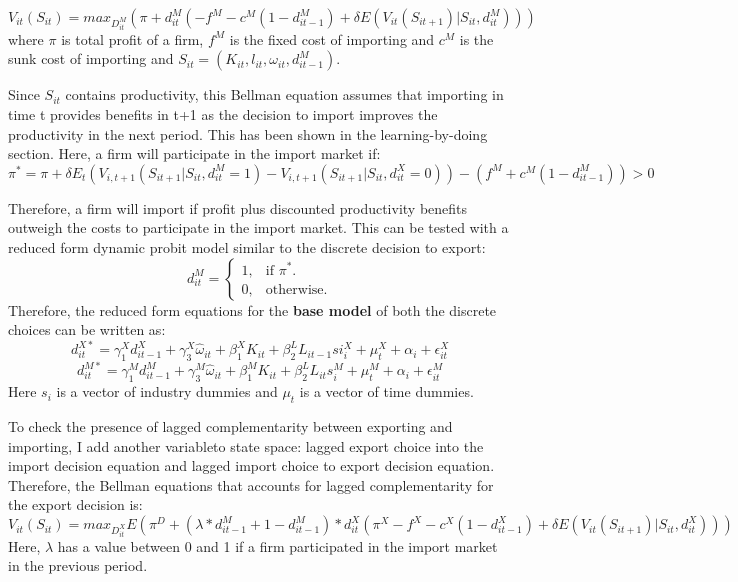 \documentclass[11pt]{article}
\begin{document}
\begin{equation}
V_{it}(S_{it})= max_{D_{it}^{M}}(\pi + d_{it}^{M}(- f^{M} -
c^{M}(1-d_{it-1}^{M})  + \delta E (V_{it}(S_{it+1})|S_{it}, d_{it}^{M})))
\end{equation}
where $\pi$ is total profit of a firm, $f^{M}$ is the fixed cost of
importing and  $c^{M}$ is the sunk cost of importing and  $S_{it} = (K_{it}, l_{it}, \omega_{it},
d_{it-1}^{M})$. 

Since $S_{it}$ contains productivity, this Bellman equation assumes that
importing in time t provides benefits  in t+1 as the decision to
import improves the productivity in the next period. This has been
shown in
the learning-by-doing section. Here, a firm will participate in the
import market if:
\begin{equation}
\pi^{*}= \pi  +
\delta E_{t}(V_{i,t+1}(S_{it+1}|S_{it},d_{it}^{M}=1) -
V_{i,t+1}(S_{it+1}|S_{it},d_{it}^{X}=0) ) -  (f^{M} +
c^{M}(1-d_{it-1}^{M})) > 0
\end{equation}

Therefore,  a firm will import if profit
plus discounted 
productivity benefits outweigh the costs to participate in the import
market. This can be tested with a reduced form dynamic probit model similar to
the discrete decision to export: 
\begin{equation}
  d_{it}^{M}=\begin{cases}
   1 , & \text{if $\pi^{*}  $}.\\
   0 , & \text{otherwise}.
  \end{cases}
\end{equation}
Therefore, the reduced form equations for the \textbf{base model} of both the discrete choices
can be written as:
\begin{equation}
d_{it}^{X*} = \gamma_{1}^{X} d_{it-1}^{X} + 
\gamma_{3}^{X} \hat{\omega}_{it}  + \beta_{1}^{X}K_{it}  +\beta_{2}^{L}L_{it-1}
si_{i}^{X} + \mu_{t}^{X}  + \alpha_{i}+\epsilon_{it}^{X}
\end{equation}
\begin{equation}
d_{it}^{M*} = \gamma_{1}^{M} d_{it-1}^{M} + 
\gamma_{3}^{M} \hat{\omega}_{it}  + \beta_{1}^{M}K_{it}  +\beta_{2}^{L}L_{it}
s_{i}^{M} + \mu_{t}^{M}  + \alpha_{i}+\epsilon_{it}^{M}
\end{equation}
Here $s_{i}$ is a vector of industry dummies and $\mu_{t}$ is a vector
of time dummies. 

To check the presence of lagged complementarity between exporting and
importing, I add another variableto state space: lagged export
choice into the import decision equation and lagged import choice
to export decision equation. Therefore, the Bellman equations that
accounts for lagged complementarity for the export decision is: 
\begin{equation}
V_{it}(S_{it})= max_{D_{it}^{X}}E(\pi^{D} + 
(\lambda *d_{it-1}^{M} + 1 - d_{it-1}^{M})*d_{it}^{X}(\pi^{X}- f^{X} -
c^{X}(1-d_{it-1}^{X})  + \delta E (V_{it}(S_{it+1})|S_{it}, d_{it}^{X})))
\end{equation}
Here, $\lambda$ has a value between 0 and 1 if a firm participated in
the import market in the previous period.
\end{document}

